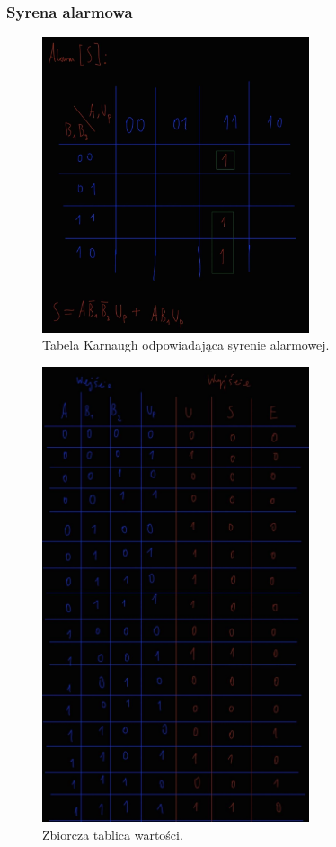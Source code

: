 \documentclass{article}
\begin{document}
\subsubsection{Syrena alarmowa}
\begin{figure}[H]
\includegraphics[width=0.7\textwidth]{Ksyrena}
\caption{Tabela Karnaugh odpowiadająca syrenie alarmowej.}
\end{figure}
\begin{figure}[H]
\includegraphics[width=0.7\textwidth]{Kpelna}
\caption{Zbiorcza tablica wartości.}
\end{figure}
\end{document}
